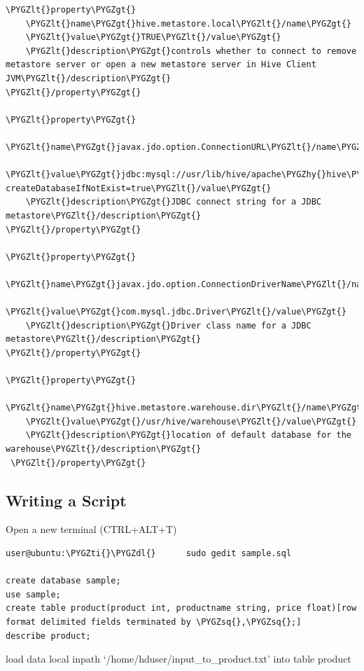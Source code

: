 \documentclass[letterpaper,10pt,english]{sphinxmanual}
\def\PYGZus{\char`\_}
\def\PYGZlt{\char`\<}
\def\PYGZgt{\char`\>}
\def\PYGZdl{\char`\$}
\def\PYGZhy{\char`\-}
\def\PYGZsq{\char`\'}
\def\PYGZti{\char`\~}
\begin{document}
\begin{Verbatim}[commandchars=\\\{\}]
\PYGZlt{}property\PYGZgt{}
    \PYGZlt{}name\PYGZgt{}hive.metastore.local\PYGZlt{}/name\PYGZgt{}
    \PYGZlt{}value\PYGZgt{}TRUE\PYGZlt{}/value\PYGZgt{}
    \PYGZlt{}description\PYGZgt{}controls whether to connect to remove metastore server or open a new metastore server in Hive Client JVM\PYGZlt{}/description\PYGZgt{}
\PYGZlt{}/property\PYGZgt{}

\PYGZlt{}property\PYGZgt{}
    \PYGZlt{}name\PYGZgt{}javax.jdo.option.ConnectionURL\PYGZlt{}/name\PYGZgt{}
    \PYGZlt{}value\PYGZgt{}jdbc:mysql://usr/lib/hive/apache\PYGZhy{}hive\PYGZhy{}0.13.0\PYGZhy{}bin/metastore\PYGZus{}db? createDatabaseIfNotExist=true\PYGZlt{}/value\PYGZgt{}
    \PYGZlt{}description\PYGZgt{}JDBC connect string for a JDBC metastore\PYGZlt{}/description\PYGZgt{}
\PYGZlt{}/property\PYGZgt{}

\PYGZlt{}property\PYGZgt{}
    \PYGZlt{}name\PYGZgt{}javax.jdo.option.ConnectionDriverName\PYGZlt{}/name\PYGZgt{}
    \PYGZlt{}value\PYGZgt{}com.mysql.jdbc.Driver\PYGZlt{}/value\PYGZgt{}
    \PYGZlt{}description\PYGZgt{}Driver class name for a JDBC metastore\PYGZlt{}/description\PYGZgt{}
\PYGZlt{}/property\PYGZgt{}

\PYGZlt{}property\PYGZgt{}
    \PYGZlt{}name\PYGZgt{}hive.metastore.warehouse.dir\PYGZlt{}/name\PYGZgt{}
    \PYGZlt{}value\PYGZgt{}/usr/hive/warehouse\PYGZlt{}/value\PYGZgt{}
    \PYGZlt{}description\PYGZgt{}location of default database for the warehouse\PYGZlt{}/description\PYGZgt{}
 \PYGZlt{}/property\PYGZgt{}
\end{Verbatim}


\subsection{Writing a Script}
\label{hive:writing-a-script}
Open a new terminal (CTRL+ALT+T)

\begin{Verbatim}[commandchars=\\\{\}]
user@ubuntu:\PYGZti{}\PYGZdl{}      sudo gedit sample.sql

create database sample;
use sample;
create table product(product int, productname string, price float)[row format delimited fields terminated by \PYGZsq{},\PYGZsq{};]
describe product;
\end{Verbatim}

load data local inpath `/home/hduser/input\_to\_product.txt' into table product
\end{document}
